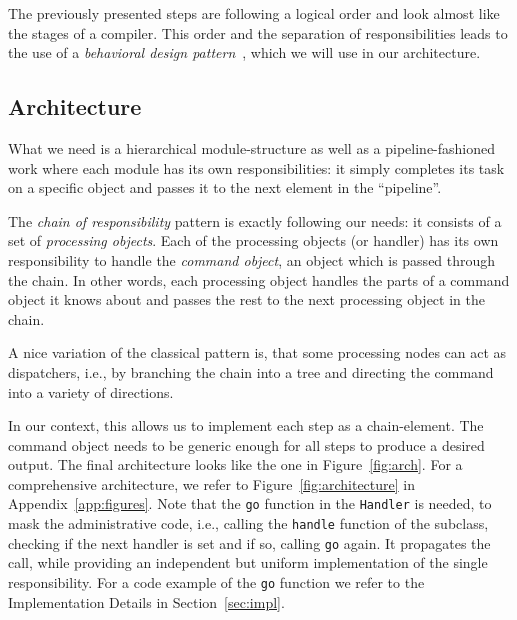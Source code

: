 The previously presented steps are following a logical order and look almost like the stages of a compiler. This order and the separation of responsibilities leads to the use of a \emph{behavioral design pattern}~\cite{design-patterns}, which we will use in our architecture. 

\subsection*{Architecture}

What we need is a hierarchical module-structure as well as a pipeline-fashioned work where each module has its own responsibilities: it simply completes its task on a specific object and passes it to the next element in the ``pipeline''. 


The \emph{chain of responsibility} pattern is exactly following our needs: it consists of a set of \emph{processing objects}. Each of the processing objects (or handler) has its own responsibility to handle the \emph{command object}, an object which is passed through the chain. In other words, each processing object handles the parts of a command object it knows about and passes the rest to the next processing object in the chain. 


A nice variation of the classical pattern is, that some processing nodes can act as dispatchers, i.e., by branching the chain into a tree and directing the command into a variety of directions. 

In our context, this allows us to implement each step as a chain-element. The command object needs to be generic enough for all steps to produce a desired output. The final architecture looks like the one in Figure~\ref{fig:arch}. For a comprehensive architecture, we refer to Figure~\ref{fig:architecture} in Appendix~\ref{app:figures}. Note that the \verb|go| function in the \verb|Handler| is needed, to mask the administrative code, i.e., calling the \verb|handle| function of the subclass, checking if the next handler is set and if so, calling \verb|go| again. It propagates the call, while providing an independent but uniform implementation of the single responsibility. For a code example of the \verb|go| function we refer to the Implementation Details in Section~\ref{sec:impl}.


